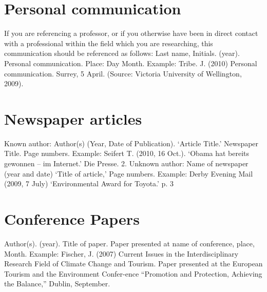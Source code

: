 \section{Personal communication}
\label{sec:personalcommunication}

If you are referencing a professor, or if you otherwise have been in direct contact with a professional within the field which you are researching, this communication should be referenced as follows:
Last name, Initials. (year). Personal communication. Place: Day Month. 
Example:
Tribe. J. (2010) Personal communication. Surrey, 5 April. 
(Source: Victoria University of Wellington, 2009). 

\section{Newspaper articles}
\label{sec:newspaper}

Known author:
Author(s) (Year, Date of Publication). ‘Article Title.’ Newspaper Title. Page numbers.
Example:
Seifert T. (2010, 16 Oct.). ‘Obama hat bereits gewonnen – im Internet.’ Die Presse. 2.
Unknown author:
Name of newspaper (year and date) ‘Title of article,’ Page numbers.
Example:
Derby Evening Mail (2009, 7 July) ‘Environmental Award for Toyota.’ p. 3


\section{Conference Papers}
\label{sec:confpaper}

Author(s). (year). Title of paper. Paper presented at name of conference, place, Month.
Example:
Fischer, J. (2007) Current Issues in the Interdisciplinary Research Field of Climate Change and Tourism. Paper presented at the European Tourism and the Environment Confer-ence “Promotion and Protection, Achieving the Balance,” Dublin, September.




\newpage

\printbibliography

\nocite{*}





